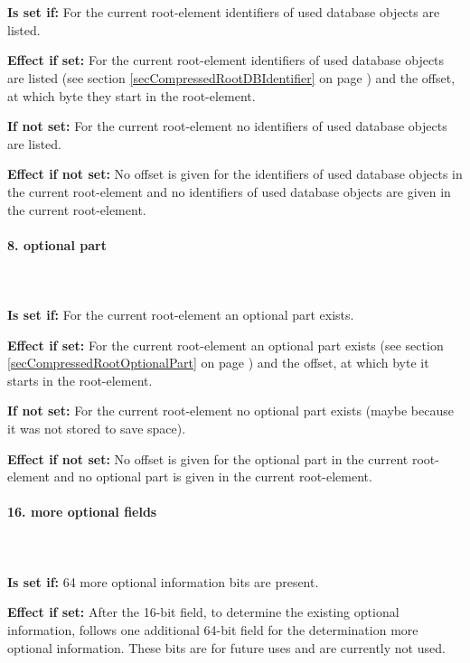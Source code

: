 \ \\\\\noindent
\textbf{Is set if:} For the current root-element identifiers of used database objects are listed.

\bigskip\noindent
\textbf{Effect if set:}
For the current root-element identifiers of used database objects are listed (see section \ref{secCompressedRootDBIdentifier} on page \pageref{secCompressedRootDBIdentifier}) and the offset, at which byte they start in the root-element.

\bigskip\noindent
\textbf{If not set:} For the current root-element no identifiers of used database objects are listed.

\bigskip\noindent
\textbf{Effect if not set:}
No offset is given for the identifiers of used database objects in the current root-element and no identifiers of used database objects are given in the current root-element.


\paragraph{8. optional part}

\ \\\\\noindent
\textbf{Is set if:} For the current root-element an optional part exists.

\bigskip\noindent
\textbf{Effect if set:}
For the current root-element an optional part exists (see section \ref{secCompressedRootOptionalPart} on page \pageref{secCompressedRootOptionalPart}) and the offset, at which byte it starts in the root-element.

\bigskip\noindent
\textbf{If not set:} For the current root-element no optional part exists (maybe because it was not stored to save space).

\bigskip\noindent
\textbf{Effect if not set:}
No offset is given for the optional part in the current root-element and no optional part is given in the current root-element.


\paragraph{16. more optional fields}

\ \\\\\noindent
\textbf{Is set if:} 64 more optional information bits are present.

\bigskip\noindent
\textbf{Effect if set:}
After the 16-bit field, to determine the existing optional information, follows one additional 64-bit field for the determination more optional information. These bits are for future uses and are currently not used.

